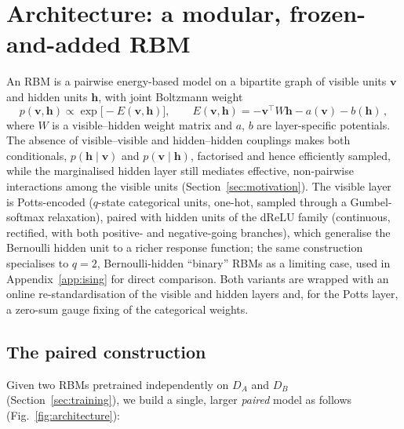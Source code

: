 \documentclass[11pt]{article}
\newcommand{\DA}{D_A}
\newcommand{\DB}{D_B}
\begin{document}
\section{Architecture: a modular, frozen-and-added RBM}
\label{sec:architecture}

An RBM is a pairwise energy-based model on a bipartite graph of visible
units $\bm{v}$ and hidden units $\bm{h}$, with joint Boltzmann weight
\begin{equation}
p(\bm{v},\bm{h}) \propto \exp\!\big[-E(\bm{v},\bm{h})\big], \qquad
E(\bm{v},\bm{h}) = -\bm{v}^\top W \bm{h} - a(\bm{v}) - b(\bm{h}) \, ,
\label{eq:rbm-energy}
\end{equation}
where $W$ is a visible--hidden weight matrix and $a$, $b$ are
layer-specific potentials. The absence of visible--visible and
hidden--hidden couplings makes both conditionals, $p(\bm{h}\mid\bm{v})$
and $p(\bm{v}\mid\bm{h})$, factorised and hence efficiently sampled, while
the marginalised hidden layer still mediates effective, non-pairwise
interactions among the visible units (Section~\ref{sec:motivation}). The
visible layer is Potts-encoded ($q$-state categorical units, one-hot,
sampled through a Gumbel-softmax relaxation), paired with hidden units of
the dReLU family (continuous, rectified, with both positive- and
negative-going branches), which generalise the Bernoulli hidden unit to a
richer response function; the same construction specialises to $q=2$,
Bernoulli-hidden ``binary'' RBMs as a limiting case, used in
Appendix~\ref{app:ising} for direct comparison. Both variants are wrapped
with an online re-standardisation of the visible and hidden layers and,
for the Potts layer, a zero-sum gauge fixing of the categorical weights.

\subsection{The paired construction}
\label{sec:paired-construction}

Given two RBMs pretrained independently on $\DA$ and $\DB$
(Section~\ref{sec:training}), we build a single, larger \emph{paired}
model as follows (Fig.~\ref{fig:architecture}):
\end{document}
